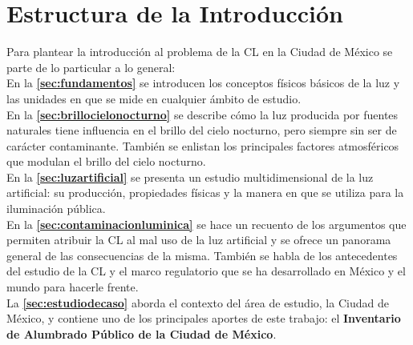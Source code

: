 \chapter*{Estructura de la Introducción}

Para plantear la introducción al problema de la CL en la Ciudad de México se parte de lo particular a lo general:\\

En la \textbf{\autoref{sec:fundamentos}} se introducen los conceptos físicos básicos de la luz y las unidades en que se mide en cualquier ámbito de estudio.\\

En la \textbf{\autoref{sec:brillocielonocturno}} se describe cómo la luz producida por fuentes naturales tiene influencia en el brillo del cielo nocturno, pero siempre sin ser de carácter contaminante. También se enlistan los principales factores atmosféricos que modulan el brillo del cielo nocturno.\\

En la \textbf{\autoref{sec:luzartificial}} se presenta un estudio multidimensional de la luz artificial: su producción, propiedades físicas y la manera en que se utiliza para la iluminación pública.\\

En la \textbf{\autoref{sec:contaminacionluminica}} se hace un recuento de los argumentos que permiten atribuir la CL al mal uso de la luz artificial y se ofrece un panorama general de las consecuencias de la misma. También se habla de los antecedentes del estudio de la CL y el marco regulatorio que se ha desarrollado en México y el mundo para hacerle frente.\\

La \textbf{\autoref{sec:estudiodecaso}} aborda el contexto del área de estudio, la Ciudad de México, y contiene uno de los principales aportes de este trabajo: el \textbf{Inventario de Alumbrado Público de la Ciudad de México}.